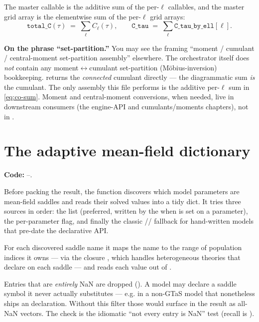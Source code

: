 The master callable  is the additive sum of the per-$\ell$
callables, and the master grid array  is the elementwise sum of the
per-$\ell$ grid arrays:
\begin{equation}
  \texttt{total\_C}(\tau) \;=\; \sum_\ell C_\ell(\tau),
  \qquad
  \texttt{C\_tau} \;=\; \sum_\ell \texttt{C\_tau\_by\_ell}[\ell].
  \label{eq:co-sum}
\end{equation}

\begin{note}
\textbf{On the phrase ``set-partition.''}
You may see the framing ``moment / cumulant / central-moment set-partition
assembly'' elsewhere. The orchestrator itself does \emph{not} contain any
moment$\leftrightarrow$cumulant set-partition (M\"obius-inversion) bookkeeping.
 returns the \emph{connected} cumulant directly --- the
diagrammatic sum \emph{is} the cumulant. The only assembly this file performs is
the additive per-$\ell$ sum in \eqref{eq:co-sum}. Moment and central-moment
conversions, when needed, live in downstream consumers (the engine-API and
cumulants/moments chapters), not in .
\end{note}

\section{The adaptive mean-field dictionary}\label{sec:co-mfdict}

\textbf{Code:} --.

Before packing the result, the function discovers which model parameters are
mean-field saddles and reads their solved values into a tidy
 dict. It tries three sources in order:
the  list (preferred, written by the
 when  is set on a parameter), the
per-parameter  flag, and finally the classic
// fallback for hand-written models that
pre-date the declarative API.

For each discovered saddle name it maps the name to the range of population
indices it owns --- via the closure , which handles
heterogeneous theories that declare  on each saddle ---
and reads each value out of .

\begin{gotcha}
Entries that are \emph{entirely} NaN are dropped ().
A model may declare a saddle symbol it never actually substitutes --- e.g.
 in a non-GTaS model that nonetheless ships an 
declaration. Without this filter those would surface in the result as all-NaN
vectors. The check  is the idiomatic
``not every entry is NaN'' test (recall  is ).
\end{gotcha}

